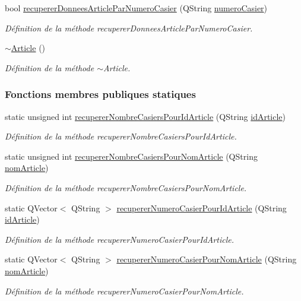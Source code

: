 \begin{DoxyCompactItemize}
bool \hyperlink{class_article_a5d8241c703f142bbc8b011f867fd953f}{recuperer\+Donnees\+Article\+Par\+Numero\+Casier} (Q\+String \hyperlink{class_article_a4b8dd9598cc16200c60c7f55196fc26d}{numero\+Casier})
\begin{DoxyCompactList}\small\item\em Définition de la méthode recuperer\+Donnees\+Article\+Par\+Numero\+Casier. \end{DoxyCompactList}\item 
\hyperlink{class_article_a5c429e49b30104b1069044d0e1a6aa1a}{$\sim$\+Article} ()
\begin{DoxyCompactList}\small\item\em Définition de la méthode $\sim$\+Article. \end{DoxyCompactList}\end{DoxyCompactItemize}
\subsubsection*{Fonctions membres publiques statiques}
\begin{DoxyCompactItemize}
\item 
static unsigned int \hyperlink{class_article_a537f0aa471a7466425b6abf6c34058d6}{recuperer\+Nombre\+Casiers\+Pour\+Id\+Article} (Q\+String \hyperlink{class_article_a9f2f7a04139f26accec145066a5aacae}{id\+Article})
\begin{DoxyCompactList}\small\item\em Définition de la méthode recuperer\+Nombre\+Casiers\+Pour\+Id\+Article. \end{DoxyCompactList}\item 
static unsigned int \hyperlink{class_article_acdd796ad55a7fde0c229c8c2df7050cc}{recuperer\+Nombre\+Casiers\+Pour\+Nom\+Article} (Q\+String \hyperlink{class_article_a0ba6c08f7dd54e4b7caf673ecd6b41a6}{nom\+Article})
\begin{DoxyCompactList}\small\item\em Définition de la méthode recuperer\+Nombre\+Casiers\+Pour\+Nom\+Article. \end{DoxyCompactList}\item 
static Q\+Vector$<$ Q\+String $>$ \hyperlink{class_article_aa7aeaee7858b50714e9c022899b9b82d}{recuperer\+Numero\+Casier\+Pour\+Id\+Article} (Q\+String \hyperlink{class_article_a9f2f7a04139f26accec145066a5aacae}{id\+Article})
\begin{DoxyCompactList}\small\item\em Définition de la méthode recuperer\+Numero\+Casier\+Pour\+Id\+Article. \end{DoxyCompactList}\item 
static Q\+Vector$<$ Q\+String $>$ \hyperlink{class_article_aa311f3d149340622383c418444aa65a4}{recuperer\+Numero\+Casier\+Pour\+Nom\+Article} (Q\+String \hyperlink{class_article_a0ba6c08f7dd54e4b7caf673ecd6b41a6}{nom\+Article})
\begin{DoxyCompactList}\small\item\em Définition de la méthode recuperer\+Numero\+Casier\+Pour\+Nom\+Article. \end{DoxyCompactList}\end{DoxyCompactItemize}
